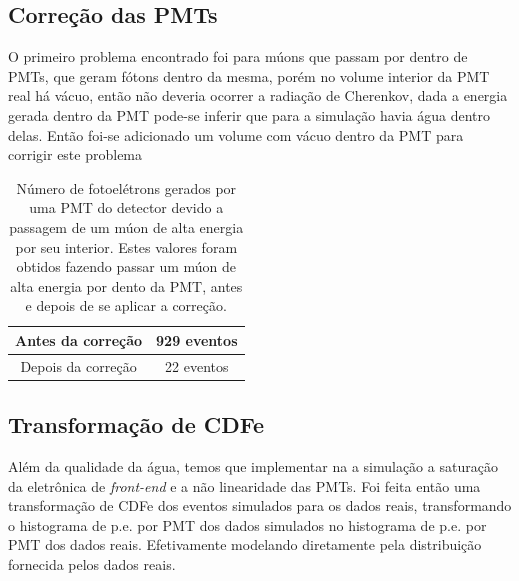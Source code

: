 \subsection{Correção das PMTs}

O primeiro problema encontrado foi para múons que passam por dentro de PMTs, que geram fótons dentro da mesma, porém no volume interior da PMT real há vácuo, então não deveria ocorrer a radiação de Cherenkov, dada a energia gerada dentro da PMT pode-se inferir que para a simulação havia água dentro delas. Então foi-se adicionado um volume com vácuo dentro da PMT para corrigir este problema

\begin{table}[H]
	\centering
	\begin{tabular}{|c|c|}
		\hline
		Antes da correção  & 929 eventos \\ \hline
		Depois da correção & 22  eventos \\ \hline
	\end{tabular}

\caption{Número de fotoelétrons gerados por uma PMT do detector devido a passagem de um múon de alta energia por seu interior. Estes valores foram obtidos fazendo passar um múon de alta energia por dento da PMT, antes e depois de se aplicar a correção.}
\end{table}


\subsection{Transformação de CDFe}
\label{CDFe}

Além da qualidade da água, temos que implementar na a simulação a saturação da eletrônica de \emph{front-end} e a não linearidade das PMTs. Foi feita então uma transformação de \ac{CDFe} dos eventos simulados para os dados reais, transformando o histograma de p.e. por PMT dos dados simulados no histograma de p.e. por PMT dos dados reais. Efetivamente modelando diretamente pela distribuição fornecida pelos dados reais.



